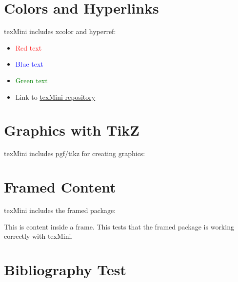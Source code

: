 \documentclass[11pt]{article}
\begin{document}
\section{Colors and Hyperlinks}

texMini includes xcolor and hyperref:

\begin{itemize}
    \item \textcolor{red}{Red text}
    \item \textcolor{blue}{Blue text}
    \item \textcolor{green}{Green text}
    \item Link to \href{https://github.com/alexmill/texMini}{texMini repository}
\end{itemize}

\section{Graphics with TikZ}

texMini includes pgf/tikz for creating graphics:

\begin{center}
\end{center}

\section{Framed Content}

texMini includes the framed package:

\begin{framed}
This is content inside a frame. This tests that the framed package is working correctly with texMini.
\end{framed}

\section{Bibliography Test}
\end{document}
